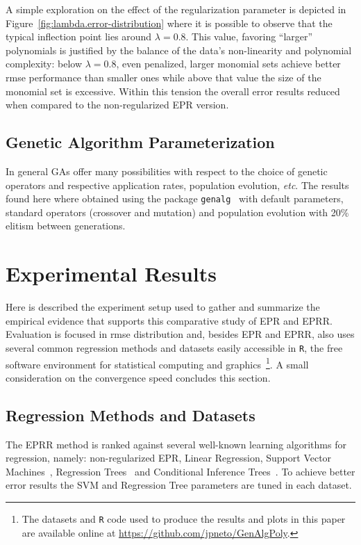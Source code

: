 \documentclass[times,review,preprint]{elsarticle}
\begin{document}
A simple exploration on the effect of the regularization parameter is depicted in Figure~\ref{fig:lambda.error-distribution} where it is possible to observe that the typical inflection point lies around $\lambda = 0.8$. This value, favoring ``larger'' polynomials is justified by the balance of the data's non-linearity and polynomial complexity: below $\lambda = 0.8$, even penalized, larger monomial sets achieve better \ac{rmse} performance than smaller ones while above that value the size of the monomial set is excessive. Within this tension the overall error results reduced when compared to the non-regularized \ac{EPR} version.

\subsection{Genetic Algorithm Parameterization}

In general \acp{GA} offer many possibilities with respect to the choice of genetic operators and respective application rates, population evolution, \emph{etc}. The results found here where obtained using the package \texttt{genalg}~\citep{Willighagen:2012aa} with default parameters, standard operators (crossover and mutation) and population evolution with 20\% elitism between generations.

\section{Experimental Results}

Here is described the experiment setup used to gather and summarize the empirical evidence that supports this comparative study of \ac{EPR} and \ac{EPRR}. Evaluation is focused in \ac{rmse} distribution and, besides \ac{EPR} and \ac{EPRR}, also uses several common regression methods and datasets easily accessible in \texttt{R}, the free software environment for statistical computing and graphics~\citep{R-Core-Team:2013aa}\footnote{The datasets and \texttt{R} code used to produce the results and plots in this paper are available online at \url{https://github.com/jpneto/GenAlgPoly}.}. A small consideration on the convergence speed concludes this section.

\subsection{Regression Methods and Datasets}

The \ac{EPRR} method is ranked against several well-known learning algorithms for regression, namely: non-regularized \ac{EPR}, Linear Regression, Support Vector Machines~\citep{Meyer:2012aa}, Regression Trees~\citep{Therneau:2013aa} and Conditional Inference Trees~\citep{Hothorn:2006aa,Strobl:2007aa,Strobl:2008aa}. To achieve better error results the \ac{SVM} and Regression Tree parameters are tuned in each dataset.
\end{document}
